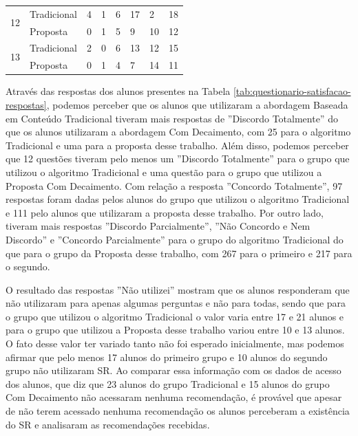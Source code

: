 \begin{table}[h]
\begin{tabular}{|p{1.5cm}|p{1.8cm}|p{2.2cm}|p{0.6cm}|p{0.6cm}|p{0.6cm}|p{2.3cm}|p{2cm}|}
\hline
\multirow{2}{*}{12}         & Tradicional & 4                   & 1                     & 6                         & 17                    & 2                   & 18           \\
                            & Proposta    & 0                   & 1                     & 5                         & 9                     & 10                  & 12           \\
\hline
\multirow{2}{*}{13}         & Tradicional & 2                   & 0                     & 6                         & 13                    & 12                  & 15           \\
                            & Proposta    & 0                   & 1                     & 4                         & 7                     & 14                  & 11           \\
\hline
\end{tabular}
\end{table}

Através das respostas dos alunos presentes na Tabela \ref{tab:questionario-satisfacao-respostas}, podemos perceber que
os alunos que utilizaram a abordagem Baseada em Conteúdo Tradicional tiveram mais respostas de ''Discordo Totalmente'' do
que os alunos utilizaram a abordagem Com Decaimento, com 25 para o algoritmo Tradicional e uma para a proposta desse trabalho.
Além disso, podemos perceber que 12 questões tiveram pelo menos um ''Discordo Totalmente'' para o grupo que utilizou o algoritmo
Tradicional e uma questão para o grupo que utilizou a Proposta Com Decaimento. Com relação a resposta ''Concordo Totalmente'',
97 respostas foram dadas pelos alunos do grupo que utilizou o algoritmo Tradicional e 111
pelo alunos que utilizaram a proposta desse trabalho. Por outro lado, tiveram mais respostas ''Discordo Parcialmente'',
''Não Concordo e Nem Discordo'' e ''Concordo Parcialmente'' para o grupo do algoritmo Tradicional do que para o grupo da
Proposta desse trabalho, com 267 para o primeiro e 217 para o segundo.

O resultado das respostas ''Não utilizei'' mostram que os alunos responderam que não utilizaram para apenas algumas perguntas e não para todas, sendo que para o grupo
que utilizou o algoritmo Tradicional o valor varia entre 17 e 21 alunos e para o grupo que utilizou a Proposta desse
trabalho variou entre 10 e 13 alunos. O fato desse valor ter variado tanto não foi esperado inicialmente, mas podemos
afirmar que pelo menos 17 alunos do primeiro grupo e 10 alunos do segundo grupo não utilizaram SR. Ao comparar essa
informação com os dados de acesso dos alunos, que diz que 23 alunos do grupo Tradicional e 15 alunos do grupo Com
Decaimento não acessaram nenhuma recomendação, é provável que apesar de não terem acessado nenhuma recomendação os
alunos perceberam a existência do SR e analisaram as recomendações recebidas.

